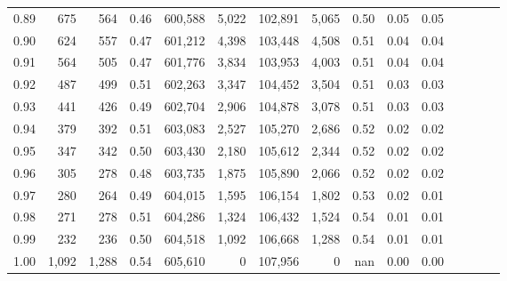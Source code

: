 \begin{tabular}{rrrcrrrrrrrrrrr}
0.89 &     675 &    564 &                                       0.46 &  600,588 &    5,022 &  102,891 &    5,065 &  0.50 &  0.05 &                         0.05 \\
0.90 &     624 &    557 &                                       0.47 &  601,212 &    4,398 &  103,448 &    4,508 &  0.51 &  0.04 &                         0.04 \\
0.91 &     564 &    505 &                                       0.47 &  601,776 &    3,834 &  103,953 &    4,003 &  0.51 &  0.04 &                         0.04 \\
0.92 &     487 &    499 &                                       0.51 &  602,263 &    3,347 &  104,452 &    3,504 &  0.51 &  0.03 &                         0.03 \\
0.93 &     441 &    426 &                                       0.49 &  602,704 &    2,906 &  104,878 &    3,078 &  0.51 &  0.03 &                         0.03 \\
0.94 &     379 &    392 &                                       0.51 &  603,083 &    2,527 &  105,270 &    2,686 &  0.52 &  0.02 &                         0.02 \\
0.95 &     347 &    342 &                                       0.50 &  603,430 &    2,180 &  105,612 &    2,344 &  0.52 &  0.02 &                         0.02 \\
0.96 &     305 &    278 &                                       0.48 &  603,735 &    1,875 &  105,890 &    2,066 &  0.52 &  0.02 &                         0.02 \\
0.97 &     280 &    264 &                                       0.49 &  604,015 &    1,595 &  106,154 &    1,802 &  0.53 &  0.02 &                         0.01 \\
0.98 &     271 &    278 &                                       0.51 &  604,286 &    1,324 &  106,432 &    1,524 &  0.54 &  0.01 &                         0.01 \\
0.99 &     232 &    236 &                                       0.50 &  604,518 &    1,092 &  106,668 &    1,288 &  0.54 &  0.01 &                         0.01 \\
1.00 &   1,092 &  1,288 &                                       0.54 &  605,610 &        0 &  107,956 &        0 &   nan &  0.00 &                         0.00 \\
\bottomrule
\end{tabular}

